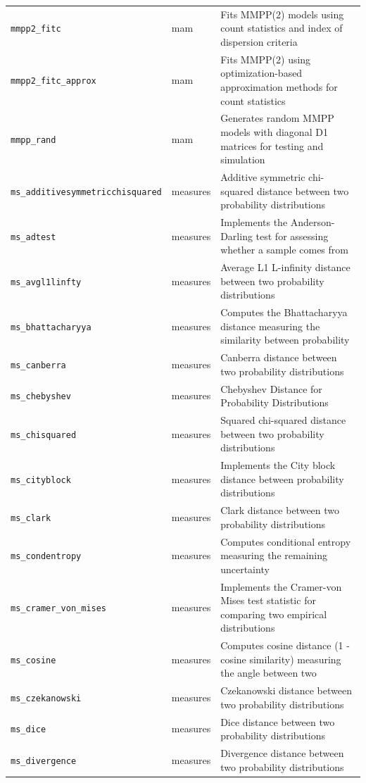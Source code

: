 \begin{footnotesize}
\begin{longtable}{|p{0.4\linewidth}|p{0.1\linewidth}|p{0.5\linewidth}|}
\texttt{mmpp2\_fitc} & mam & Fits MMPP(2) models using count statistics and index of dispersion criteria\\
\texttt{mmpp2\_fitc\_approx} & mam & Fits MMPP(2) using optimization-based approximation methods for count statistics\\
\texttt{mmpp\_rand} & mam & Generates random MMPP models with diagonal D1 matrices for testing and simulation\\
\texttt{ms\_additivesymmetricchisquared} & measures & Additive symmetric chi-squared distance between two probability distributions\\
\texttt{ms\_adtest} & measures & Implements the Anderson-Darling test for assessing whether a sample comes from\\
\texttt{ms\_avgl1linfty} & measures & Average L1 L-infinity distance between two probability distributions\\
\texttt{ms\_bhattacharyya} & measures & Computes the Bhattacharyya distance measuring the similarity between probability\\
\texttt{ms\_canberra} & measures & Canberra distance between two probability distributions\\
\texttt{ms\_chebyshev} & measures & Chebyshev Distance for Probability Distributions\\
\texttt{ms\_chisquared} & measures & Squared chi-squared distance between two probability distributions\\
\texttt{ms\_cityblock} & measures & Implements the City block distance between probability distributions\\
\texttt{ms\_clark} & measures & Clark distance between two probability distributions\\
\texttt{ms\_condentropy} & measures & Computes conditional entropy measuring the remaining uncertainty\\
\texttt{ms\_cramer\_von\_mises} & measures & Implements the Cramer-von Mises test statistic for comparing two empirical distributions\\
\texttt{ms\_cosine} & measures & Computes cosine distance (1 - cosine similarity) measuring the angle between two\\
\texttt{ms\_czekanowski} & measures & Czekanowski distance between two probability distributions\\
\texttt{ms\_dice} & measures & Dice distance between two probability distributions\\
\texttt{ms\_divergence} & measures & Divergence distance between two probability distributions\\

\end{longtable}
\end{footnotesize}

